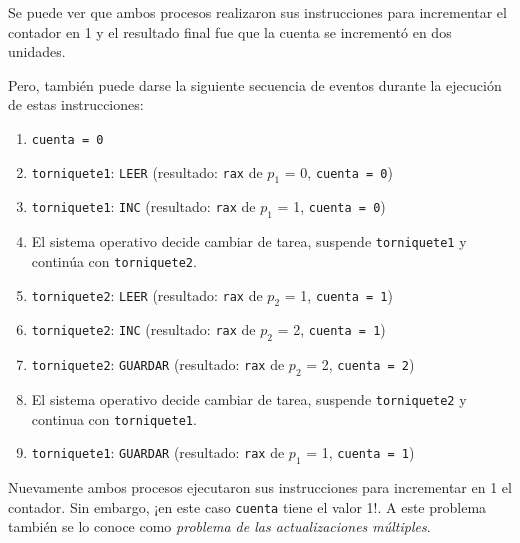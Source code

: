 \documentclass[11pt,fleqn]{book} %
\begin{document}
Se puede ver que ambos procesos realizaron sus instrucciones para
incrementar el contador en 1 y el resultado final fue que la cuenta se
incrementó en dos unidades.

Pero, también puede darse la siguiente secuencia de eventos durante la
ejecución de estas instrucciones:

\begin{enumerate}
\item \texttt{cuenta = 0}
\item \texttt{torniquete1}: \texttt{LEER} 		(resultado: \texttt{rax} de $p_1$ = 0, \texttt{cuenta = 0})
\item \texttt{torniquete1}: \texttt{INC} 		(resultado: \texttt{rax} de $p_1$ = 1, \texttt{cuenta = 0})
\item El sistema operativo decide cambiar de tarea, suspende \texttt{torniquete1} y
   continúa con \texttt{torniquete2}.
\item \texttt{torniquete2}: \texttt{LEER} 		(resultado: \texttt{rax} de $p_2$ = 1, \texttt{cuenta = 1})
\item \texttt{torniquete2}: \texttt{INC} 		(resultado: \texttt{rax} de $p_2$ = 2, \texttt{cuenta = 1})
\item \texttt{torniquete2}: \texttt{GUARDAR} 		(resultado: \texttt{rax} de $p_2$ = 2, \texttt{cuenta = 2})
\item El sistema operativo decide cambiar de tarea, suspende \texttt{torniquete2}
   y continua con \texttt{torniquete1}.
\item \texttt{torniquete1}: \texttt{GUARDAR} 		(resultado: \texttt{rax} de $p_1$ = 1, \texttt{cuenta = 1})
\end{enumerate}

Nuevamente ambos procesos ejecutaron sus instrucciones para
incrementar en 1 el contador. Sin embargo, ¡en este caso \texttt{cuenta}
tiene el valor 1!. A este problema también se lo conoce como \emph{problema de las actualizaciones múltiples}.
\end{document}
